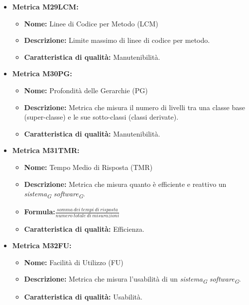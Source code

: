 \begin{itemize}
          \item \textbf{Metrica M29LCM:}
          \begin{itemize}
              \item \textbf{Nome:} Linee di Codice per Metodo (LCM)
              \item \textbf{Descrizione:} Limite massimo di linee di codice per metodo.
              \item \textbf{Caratteristica di qualità:} Manutenibilità.
          \end{itemize} 

          \item \textbf{Metrica M30PG:}
          \begin{itemize}
              \item \textbf{Nome:} Profondità delle Gerarchie (PG)
              \item \textbf{Descrizione:} Metrica che misura il numero di livelli tra una classe base (super-classe) e le sue sotto-classi (classi derivate).
              \item \textbf{Caratteristica di qualità:} Manutenibilità.
          \end{itemize} 

            \item \textbf{Metrica M31TMR:}
                  \begin{itemize}
                      \item \textbf{Nome:} Tempo Medio di Risposta (TMR)
                      \item \textbf{Descrizione:} Metrica che misura quanto è efficiente e reattivo un \textit{sistema}\textsubscript{\textit{G}} \textit{software}\textsubscript{\textit{G}}.
                      \item \textbf{Formula:}$\frac{somma \ dei \ tempi \ di \ risposta}{numero \ totale \ di \ misurazioni}$
                      \item \textbf{Caratteristica di qualità:} Efficienza.
                    \end{itemize}  


            \item \textbf{Metrica M32FU:}
                  \begin{itemize}
                      \item \textbf{Nome:} Facilità di Utilizzo (FU)
                      \item \textbf{Descrizione:} Metrica che misura l'usabilità di un \textit{sistema}\textsubscript{\textit{G}} \textit{software}\textsubscript{\textit{G}}.
                      \item \textbf{Caratteristica di qualità:} Usabilità.
                    \end{itemize}


\end{itemize}
